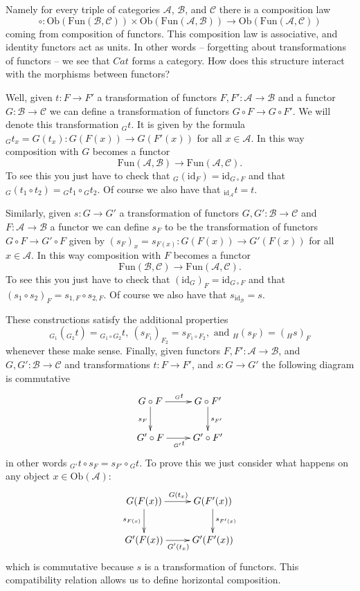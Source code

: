 \medskip\noindent
Namely for every triple
of categories $\mathcal{A}$, $\mathcal{B}$, and $\mathcal{C}$
there is a composition law
$$
\circ : \text{Ob}(\text{Fun}(\mathcal{B}, \mathcal{C}))
\times 
\text{Ob}(\text{Fun}(\mathcal{A}, \mathcal{B}))
\longrightarrow
\text{Ob}(\text{Fun}(\mathcal{A}, \mathcal{C}))
$$
coming from composition of functors. This composition law
is associative, and identity functors act as units. In other
words -- forgetting about transformations of functors --
we see that $\textit{Cat}$ forms a category. How does
this structure interact with the morphisms between functors?

\medskip\noindent
Well, given $t : F \to F'$ a transformation of
functors $F, F' : \mathcal{A} \to \mathcal{B}$ and
a functor
$G : \mathcal{B} \to \mathcal{C}$ we can define
a transformation of functors
$G\circ F \to G \circ F'$. We will denote this
transformation ${}_Gt$. It is given by the formula
${}_Gt_x = G(t_x) : G(F(x)) \to G(F'(x))$
for all $x \in \mathcal{A}$. 
In this way composition
with $G$ becomes a functor
$$
\text{Fun}(\mathcal{A}, \mathcal{B})
\longrightarrow
\text{Fun}(\mathcal{A}, \mathcal{C}).
$$
To see this you just have to check that
${}_G(\text{id}_F) = \text{id}_{G \circ F}$ and that
${}_G(t_1 \circ t_2) = {}_Gt_1 \circ {}_Gt_2$.
Of course we also have that ${}_{\text{id}_{\mathcal{A}}}t = t$.

\medskip\noindent
Similarly, given $s : G \to G'$ a transformation of
functors $G, G' : \mathcal{B} \to \mathcal{C}$ and
$F : \mathcal{A} \to \mathcal{B}$ a functor we can define
$s_F$ to be the transformation of functors
$G\circ F \to G' \circ F$ given by
$(s_F)_x = s_{F(x)} : G(F(x)) \to G'(F(x))$
for all $x \in \mathcal{A}$. In this way
composition with $F$ becomes a functor
$$
\text{Fun}(\mathcal{B}, \mathcal{C})
\longrightarrow
\text{Fun}(\mathcal{A}, \mathcal{C}).
$$
To see this you just have to check that
$(\text{id}_G)_F = \text{id}_{G\circ F}$ and that
$(s_1 \circ s_2)_F = s_{1,F} \circ s_{2,F}$.
Of course we also have that $s_{\text{id}_{\mathcal{B}}} = s$.

\medskip\noindent
These constructions satisfy the additional properties
$$
{}_{G_1}({}_{G_2}t) = {}_{G_1\circ G_2}t,\ 
(s_{F_1})_{F_2} = s_{F_1 \circ F_2}, \text{ and }
{}_H(s_F) = ({}_Hs)_F
$$
whenever these make sense.
Finally, given functors $F, F' : \mathcal{A} \to \mathcal{B}$,
and $G, G' : \mathcal{B} \to \mathcal{C}$ and transformations
$t : F \to F'$, and $s : G \to G'$ the following
diagram is commutative
$$
\xymatrix{
G \circ F \ar[r]^{{}_Gt} \ar[d]_{s_F}
&
G \circ F' \ar[d]^{s_{F'}} \\
G' \circ F \ar[r]_{{}_{G'}t}
&
G' \circ F'
}
$$
in other words ${}_{G'}t \circ s_F =  s_{F'}\circ {}_Gt$.
To prove this we just consider what happens on
any object $x \in \text{Ob}(\mathcal{A})$:
$$
\xymatrix{
G(F(x)) \ar[r]^{G(t_{x})} \ar[d]_{s_{F(x)}}
&
G(F'(x)) \ar[d]^{s_{F'(x)}} \\
G'(F(x)) \ar[r]_{G'(t_{x})}
&
G'(F'(x))
}
$$
which is commutative because $s$ is a transformation
of functors. This compatibility relation allows us
to define horizontal composition.

